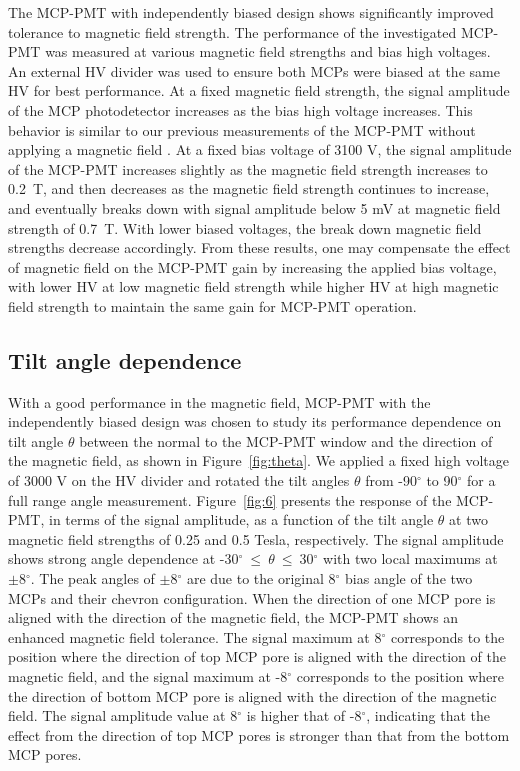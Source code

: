 \documentclass[preprint,5p]{elsarticle}
\begin{document}
The MCP-PMT with independently biased design shows significantly improved 
tolerance to magnetic field strength. The performance of the investigated 
MCP-PMT was measured at various magnetic field strengths and bias high 
voltages. An external HV divider was used to ensure both MCPs were biased at 
the same HV for best performance. At a fixed magnetic field strength, the 
signal amplitude of the MCP photodetector increases as the bias high voltage 
increases. This behavior is similar to our previous measurements of the MCP-PMT 
without applying a magnetic field \cite{21}. At a fixed bias voltage of 3100 V, 
the signal amplitude of the MCP-PMT increases slightly as the magnetic field 
strength increases to 0.2~T, and then decreases as the magnetic field strength 
continues to increase, and eventually breaks down with signal amplitude below 5 
mV at magnetic field strength of 0.7~T. With lower biased voltages, the break 
down magnetic field strengths decrease accordingly. From these results, one may 
compensate the effect of magnetic field on the MCP-PMT gain by increasing the 
applied bias voltage, with lower HV at low magnetic field strength while higher 
HV at high magnetic field strength to maintain the same gain for MCP-PMT 
operation. 



\subsection{Tilt angle dependence} \label{}
With a good performance in the magnetic field, MCP-PMT with the independently 
biased design was chosen to study its performance dependence on tilt angle 
$\theta$ between the normal to the MCP-PMT window and the direction of the 
magnetic field, as shown in Figure~\ref{fig:theta}. We applied a fixed high 
voltage of 3000 V on the HV divider and rotated the tilt angles $\theta$ from 
-90$^{\circ}$ to 90$^{\circ}$ for a full range angle measurement.  
Figure~\ref{fig:6}  presents the response of the MCP-PMT, in terms of the 
signal amplitude, as a function of the tilt angle $\theta$ at two magnetic 
field strengths of 0.25 and 0.5 Tesla, respectively.  The signal amplitude 
shows strong angle dependence at -30$^{\circ}~\leq~\theta~\leq~$30$^{\circ}$ 
with two local maximums at $\pm$8$^{\circ}$.  The peak angles of 
$\pm$8$^{\circ}$ are due to the original 8$^{\circ}$ bias angle of the two MCPs 
and their chevron configuration.  When the direction of one MCP pore is aligned 
with the direction of the magnetic field, the MCP-PMT shows an enhanced 
magnetic field tolerance. The signal maximum at 8$^{\circ}$ corresponds to the 
position where the direction of top MCP pore is aligned with the direction of 
the magnetic field, and the signal maximum at -8$^{\circ}$ corresponds to the 
position where the direction of bottom MCP pore is aligned with the direction 
of the magnetic field. The signal amplitude value at 8$^{\circ}$ is higher that 
of -8$^{\circ}$, indicating that the effect from the direction of top MCP pores 
is stronger than that from the bottom MCP pores.
\end{document}
